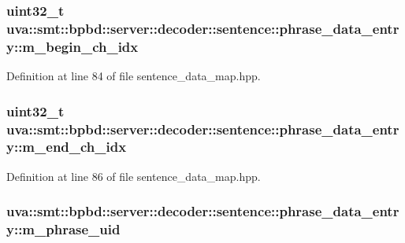 \subsubsection[{m\+\_\+begin\+\_\+ch\+\_\+idx}]{\setlength{\rightskip}{0pt plus 5cm}uint32\+\_\+t uva\+::smt\+::bpbd\+::server\+::decoder\+::sentence\+::phrase\+\_\+data\+\_\+entry\+::m\+\_\+begin\+\_\+ch\+\_\+idx}\label{structuva_1_1smt_1_1bpbd_1_1server_1_1decoder_1_1sentence_1_1phrase__data__entry_af1dcb3cbf1a48848495b72ba5e2229cd}


Definition at line 84 of file sentence\+\_\+data\+\_\+map.\+hpp.

\hypertarget{structuva_1_1smt_1_1bpbd_1_1server_1_1decoder_1_1sentence_1_1phrase__data__entry_aa83a98923844d4a3a618fefbf6bf815f}{}
\subsubsection[{m\+\_\+end\+\_\+ch\+\_\+idx}]{\setlength{\rightskip}{0pt plus 5cm}uint32\+\_\+t uva\+::smt\+::bpbd\+::server\+::decoder\+::sentence\+::phrase\+\_\+data\+\_\+entry\+::m\+\_\+end\+\_\+ch\+\_\+idx}\label{structuva_1_1smt_1_1bpbd_1_1server_1_1decoder_1_1sentence_1_1phrase__data__entry_aa83a98923844d4a3a618fefbf6bf815f}


Definition at line 86 of file sentence\+\_\+data\+\_\+map.\+hpp.

\hypertarget{structuva_1_1smt_1_1bpbd_1_1server_1_1decoder_1_1sentence_1_1phrase__data__entry_abfdf7904b3f26622c2ac3701e6e08669}{}
\subsubsection[{m\+\_\+phrase\+\_\+uid}]{ uva\+::smt\+::bpbd\+::server\+::decoder\+::sentence\+::phrase\+\_\+data\+\_\+entry\+::m\+\_\+phrase\+\_\+uid}\label{structuva_1_1smt_1_1bpbd_1_1server_1_1decoder_1_1sentence_1_1phrase__data__entry_abfdf7904b3f26622c2ac3701e6e08669}


